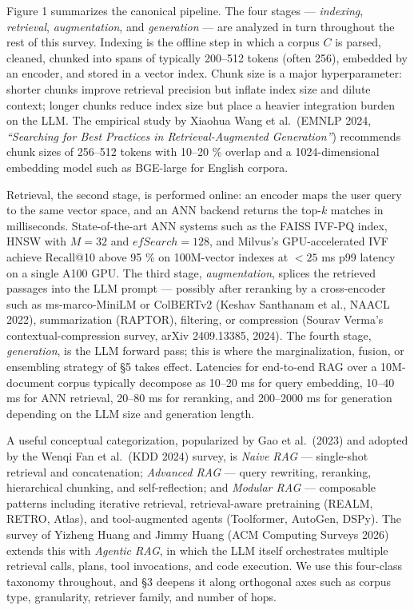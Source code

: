 Figure 1 summarizes the canonical pipeline. The four stages --- \emph{indexing}, \emph{retrieval}, \emph{augmentation}, and \emph{generation} --- are analyzed in turn throughout the rest of this survey. Indexing is the offline step in which a corpus \(C\) is parsed, cleaned, chunked into spans of typically 200--512 tokens (often 256), embedded by an encoder, and stored in a vector index. Chunk size is a major hyperparameter: shorter chunks improve retrieval precision but inflate index size and dilute context; longer chunks reduce index size but place a heavier integration burden on the LLM. The empirical study by Xiaohua Wang et al.~(EMNLP 2024, \emph{``Searching for Best Practices in Retrieval-Augmented Generation''}) recommends chunk sizes of 256--512 tokens with 10--20 \% overlap and a 1024-dimensional embedding model such as BGE-large for English corpora.

Retrieval, the second stage, is performed online: an encoder maps the user query to the same vector space, and an ANN backend returns the top-\(k\) matches in milliseconds. State-of-the-art ANN systems such as the FAISS IVF-PQ index, HNSW with \(M=32\) and \(efSearch=128\), and Milvus's GPU-accelerated IVF achieve Recall@10 above 95 \% on 100M-vector indexes at \(<25\) ms p99 latency on a single A100 GPU. The third stage, \emph{augmentation}, splices the retrieved passages into the LLM prompt --- possibly after reranking by a cross-encoder such as ms-marco-MiniLM or ColBERTv2 (Keshav Santhanam et al., NAACL 2022), summarization (RAPTOR), filtering, or compression (Sourav Verma's contextual-compression survey, arXiv 2409.13385, 2024). The fourth stage, \emph{generation}, is the LLM forward pass; this is where the marginalization, fusion, or ensembling strategy of §5 takes effect. Latencies for end-to-end RAG over a 10M-document corpus typically decompose as 10--20 ms for query embedding, 10--40 ms for ANN retrieval, 20--80 ms for reranking, and 200--2000 ms for generation depending on the LLM size and generation length.

A useful conceptual categorization, popularized by Gao et al.~(2023) and adopted by the Wenqi Fan et al.~(KDD 2024) survey, is \emph{Naive RAG} --- single-shot retrieval and concatenation; \emph{Advanced RAG} --- query rewriting, reranking, hierarchical chunking, and self-reflection; and \emph{Modular RAG} --- composable patterns including iterative retrieval, retrieval-aware pretraining (REALM, RETRO, Atlas), and tool-augmented agents (Toolformer, AutoGen, DSPy). The survey of Yizheng Huang and Jimmy Huang (ACM Computing Surveys 2026) extends this with \emph{Agentic RAG}, in which the LLM itself orchestrates multiple retrieval calls, plans, tool invocations, and code execution. We use this four-class taxonomy throughout, and §3 deepens it along orthogonal axes such as corpus type, granularity, retriever family, and number of hops.

